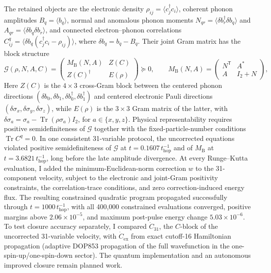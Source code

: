 \documentclass[11pt]{article}
\begin{document}
The retained objects are the electronic density \(\rho_{ij}=\langle c_j^\dagger c_i\rangle\), coherent phonon amplitudes \(B_q=\langle b_q\rangle\), normal and anomalous phonon moments \(N_{qr}=\langle\delta b_r^\dagger\delta b_q\rangle\) and \(A_{qr}=\langle\delta b_q\delta b_r\rangle\), and connected electron--phonon correlations \(C^q_{ij}=\langle\delta b_q(c_j^\dagger c_i-\rho_{ij})\rangle\), where \(\delta b_q=b_q-B_q\). Their joint Gram matrix has the block structure
\[
\mathcal G(\rho,N,A,C)=
\begin{pmatrix}
M_{\mathrm B}(N,A)&Z(C)\\
Z(C)^\dagger&E(\rho)
\end{pmatrix}\succeq0,
\qquad
M_{\mathrm B}(N,A)=
\begin{pmatrix}
N^{\mathsf T}&A^*\\
A&I_2+N
\end{pmatrix},
\]
Here \(Z(C)\) is the \(4\times3\) cross-Gram block between the centered phonon directions \((\delta b_0,\delta b_1,\delta b_0^\dagger,\delta b_1^\dagger)\) and centered electronic Pauli directions \((\delta\sigma_x,\delta\sigma_y,\delta\sigma_z)\), while \(E(\rho)\) is the \(3\times3\) Gram matrix of the latter, with \(\delta\sigma_a=\sigma_a-\operatorname{Tr}(\rho\sigma_a)I_2\), for \(a\in\{x,y,z\}\). Physical representability requires positive semidefiniteness of \(\mathcal G\) together with the fixed-particle-number conditions \(\operatorname{Tr}C^q=0\). In one consistent 31-variable protocol, the uncorrected equations violated positive semidefiniteness of \(\mathcal G\) at \(t=0.1607\,t_{\mathrm{hop}}^{-1}\) and of \(M_{\mathrm B}\) at \(t=3.6821\,t_{\mathrm{hop}}^{-1}\), long before the late amplitude divergence. At every Runge--Kutta evaluation, I added the minimum-Euclidean-norm correction \(w\) to the 31-component velocity, subject to the electronic and joint-Gram positivity constraints, the correlation-trace conditions, and zero correction-induced energy flux. The resulting constrained quadratic program propagated successfully through \(t=1000\,t_{\mathrm{hop}}^{-1}\), with all 400,000 constrained evaluations converged, positive margins above \(2.06\times10^{-5}\), and maximum post-pulse energy change \(5.03\times10^{-6}\). To test closure accuracy separately, I compared \(\dot C_{31}\), the \(C\)-block of the uncorrected 31-variable velocity, with \(\dot C_{\mathrm{ex}}\) from exact cutoff-16 Hamiltonian propagation (adaptive DOP853 propagation of the full wavefunction in the one-spin-up/one-spin-down sector). The quantum implementation and an autonomous improved closure remain planned work.
\end{document}
